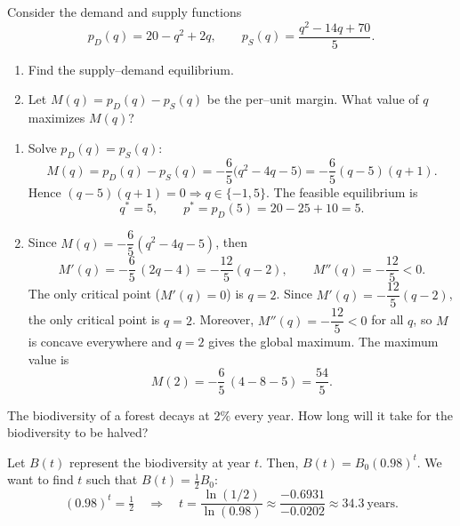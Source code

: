 \documentclass[11pt]{exam}
\begin{document}
\begin{questions}

\question[3]
Consider the demand and supply functions
\[
p_D(q)=20 - q^2 + 2q,
\qquad
p_S(q)=\frac{q^2 - 14q + 70}{5}.
\]

\begin{enumerate}[leftmargin=0.5cm,label=(\alph*),rightmargin=0.2cm]
  \item Find the supply–demand equilibrium.
  \item Let $M(q)=p_D(q)-p_S(q)$ be the per–unit margin. What value of $q$ maximizes $M(q)$?
\end{enumerate}

\begin{solution}[0cm]
\begin{enumerate}[leftmargin=0.5cm,label=(\alph*),rightmargin=0.2cm]

  \item Solve $p_D(q)=p_S(q)$:
  \[
  M(q)=p_D(q)-p_S(q)
  =-\frac{6}{5}\bigl(q^2-4q-5\bigr)
  =-\frac{6}{5}(q-5)(q+1).
  \]
  Hence $(q-5)(q+1)=0\Rightarrow q\in\{-1,5\}$. The feasible equilibrium is
  \[
  q^*=5,\qquad p^*=p_D(5)=20-25+10=5.
  \]

  \item Since $M(q)=-\dfrac{6}{5}(q^2-4q-5)$, then
\[
M'(q)=-\frac{6}{5}\,(2q-4)=-\frac{12}{5}(q-2),\qquad
M''(q)=-\frac{12}{5}<0.
\]
The only critical point ($M'(q)=0$) is $q=2$. Since $M'(q)=-\dfrac{12}{5}(q-2)$, the only critical point is $q=2$. Moreover,
$M''(q)=-\dfrac{12}{5}<0$ for all $q$, so $M$ is concave everywhere and $q=2$
gives the global maximum. The maximum value is
\[
M(2)=-\frac{6}{5}\,(4-8-5)=\frac{54}{5}.
\]
\end{enumerate}
\end{solution}





\question[2]
    The biodiversity of a forest decays at $2\%$ every year. How long will it take for the biodiversity to be halved?    
\begin{solution}[0cm]
Let $B(t)$ represent the biodiversity at year $t$. Then, $B(t)=B_0(0.98)^t$. We want to find $t$ such that $B(t)=\tfrac{1}{2}B_0$:
\[
(0.98)^t=\tfrac12
\quad\Longrightarrow\quad
t=\frac{\ln(1/2)}{\ln(0.98)}\approx \frac{-0.6931}{-0.0202}\approx 34.3\ \text{years}.
\]
\end{solution}


\end{questions}
\end{document}
